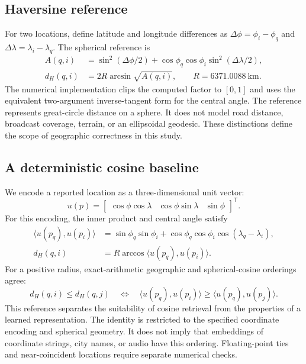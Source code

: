 \documentclass[10pt]{article}
\begin{document}
\subsection{Haversine reference}
For two locations, define latitude and longitude differences as $\Delta\phi=\phi_i-\phi_q$ and $\Delta\lambda=\lambda_i-\lambda_q$. The spherical reference is
\begin{align}
A(q,i)&=\sin^2(\Delta\phi/2)+
  \cos\phi_q\cos\phi_i\sin^2(\Delta\lambda/2),\label{eq:havfactor}\\
d_H(q,i)&=2R\arcsin\sqrt{A(q,i)},\qquad R=6371.0088\ \mathrm{km}.
\label{eq:haversine}
\end{align}
The numerical implementation clips the computed factor to $[0,1]$ and uses the equivalent two-argument inverse-tangent form for the central angle. The reference represents great-circle distance on a sphere. It does not model road distance, broadcast coverage, terrain, or an ellipsoidal geodesic. These distinctions define the scope of geographic correctness in this study.

\subsection{A deterministic cosine baseline}
We encode a reported location as a three-dimensional unit vector:
\begin{equation}
u(p)=\begin{bmatrix}
\cos\phi\cos\lambda&\cos\phi\sin\lambda&\sin\phi
\end{bmatrix}^{\mathsf T}.
\label{eq:spherical}
\end{equation}
For this encoding, the inner product and central angle satisfy
\begin{align}
\langle u(p_q),u(p_i)\rangle
 &=\sin\phi_q\sin\phi_i+
   \cos\phi_q\cos\phi_i\cos(\lambda_q-\lambda_i),\label{eq:dot}\\
d_H(q,i)&=R\arccos\langle u(p_q),u(p_i)\rangle.
\label{eq:angular}
\end{align}
For a positive radius, exact-arithmetic geographic and spherical-cosine orderings agree:
\begin{equation}
d_H(q,i)\leq d_H(q,j)
\quad\Longleftrightarrow\quad
\langle u(p_q),u(p_i)\rangle\geq\langle u(p_q),u(p_j)\rangle.
\label{eq:rankequivalence}
\end{equation}
This reference separates the suitability of cosine retrieval from the properties of a learned representation. The identity is restricted to the specified coordinate encoding and spherical geometry. It does not imply that embeddings of coordinate strings, city names, or audio have this ordering. Floating-point ties and near-coincident locations require separate numerical checks.
\end{document}
